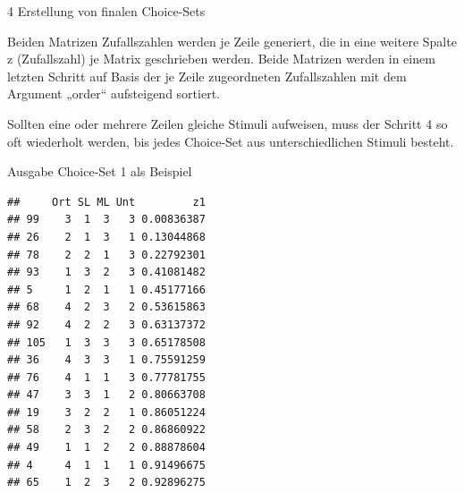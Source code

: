 \documentclass[12pt,ngerman,a4paper,ignorenonframetext,]{beamer}
\newenvironment{Shaded}{\begin{snugshade}}{\end{snugshade}}
\newcommand{\DataTypeTok}[1]{\textcolor[rgb]{0.13,0.29,0.53}{#1}}
\newcommand{\DecValTok}[1]{\textcolor[rgb]{0.00,0.00,0.81}{#1}}
\newcommand{\KeywordTok}[1]{\textcolor[rgb]{0.13,0.29,0.53}{\textbf{#1}}}
\newcommand{\NormalTok}[1]{#1}
\newcommand{\OperatorTok}[1]{\textcolor[rgb]{0.81,0.36,0.00}{\textbf{#1}}}
\newcommand{\StringTok}[1]{\textcolor[rgb]{0.31,0.60,0.02}{#1}}
\begin{document}
\begin{frame}[fragile]{4 Erstellung von finalen Choice-Sets}
\protect\hypertarget{erstellung-von-finalen-choice-sets}{}

Beiden Matrizen Zufallszahlen werden je Zeile generiert, die in eine
weitere Spalte z (Zufallszahl) je Matrix geschrieben werden. Beide
Matrizen werden in einem letzten Schritt auf Basis der je Zeile
zugeordneten Zufallszahlen mit dem Argument „order`` aufsteigend
sortiert.

\begin{Shaded}
\end{Shaded}

Sollten eine oder mehrere Zeilen gleiche Stimuli aufweisen, muss der
Schritt 4 so oft wiederholt werden, bis jedes Choice-Set aus
unterschiedlichen Stimuli besteht.

\end{frame}

\begin{frame}[fragile]{Ausgabe Choice-Set 1 als Beispiel}
\protect\hypertarget{ausgabe-choice-set-1-als-beispiel}{}

\begin{verbatim}
##     Ort SL ML Unt         z1
## 99    3  1  3   3 0.00836387
## 26    2  1  3   1 0.13044868
## 78    2  2  1   3 0.22792301
## 93    1  3  2   3 0.41081482
## 5     1  2  1   1 0.45177166
## 68    4  2  3   2 0.53615863
## 92    4  2  2   3 0.63137372
## 105   1  3  3   3 0.65178508
## 36    4  3  3   1 0.75591259
## 76    4  1  1   3 0.77781755
## 47    3  3  1   2 0.80663708
## 19    3  2  2   1 0.86051224
## 58    2  3  2   2 0.86860922
## 49    1  1  2   2 0.88878604
## 4     4  1  1   1 0.91496675
## 65    1  2  3   2 0.92896275
\end{verbatim}

\end{frame}
\end{document}

